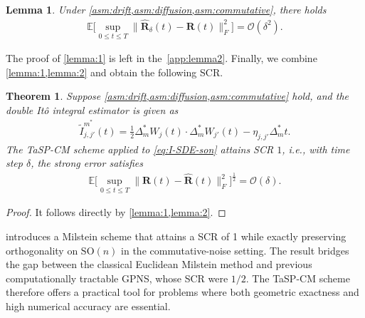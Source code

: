 \documentclass[11pt, a4paper, onecolumn]{article}
\newcommand{\E}{\mathbb{E}}
\newcommand{\bfR}{\mathbf{R}}
\newcommand{\hatR}{\widehat{\bfR}}
\renewcommand{\bf}[1]{\mathbf{#1}}
\newcommand{\nm}[1]{\mathsf{#1}}
\newcommand{\calO}{\mathcal{O}}
\newcommand{\ms}{{m^*}}
\newcommand{\Dms}{{\Delta^{*}_{m}}}
\newcommand{\tIjjpms}{ { \tilde I_{j,j'}^{\ms}} }
\newcommand{\half}{{\frac{1}{2}}}
\DeclareMathOperator{\POnm}{\Pi^O_{N_{\bf R}}}
\newtheorem{theorem}{Theorem}
\newtheorem{remark}{Remark}
\newtheorem{lemma}{Lemma}
\begin{document}
\begin{lemma}\label{lemma:2} Under \cref{asm:drift,asm:diffusion,asm:commutative}, there holds
\begin{align*}
    \E\big[ \sup_{0 \le t\le T} \| \hatR_\delta(t) - \bfR(t) \|^2_F \big]  = \calO(\delta^2).
\end{align*}
\end{lemma}
The proof of \cref{lemma:1} is left in the~\cref{app:lemma2}. Finally, we combine \cref{lemma:1,lemma:2} and obtain the following SCR.
\begin{theorem}\label{thm:convergence-comm} 
    Suppose \cref{asm:drift,asm:diffusion,asm:commutative} hold, and the double It\^o integral estimator is given as 
    \begin{align*}
        \tIjjpms(t) = \half \Dms W_j(t) \cdot \Dms W_{j'}(t) - \eta_{j,j'}\Dms t.
    \end{align*}
    The TaSP-CM scheme applied to \eqref{eq:I-SDE-son} attains SCR $1$, i.e., with time step $\delta$, the strong error satisfies
\begin{align*}
          \E\big[ \sup_{0 \le t\le T} \| \bfR(t) - \hatR(t) \|^2_F \big]^{\half} = \calO(\delta).
     \end{align*}
\end{theorem}
\begin{proof}
It follows directly by \cref{lemma:1,lemma:2}.
\end{proof}

 introduces a Milstein scheme that attains a SCR of 1 while exactly preserving orthogonality on $\mathrm{SO}(n)$ in the commutative-noise setting. The result bridges the gap between the classical Euclidean Milstein method and previous computationally tractable GPNS, whose SCR were $1/2$. The TaSP-CM scheme therefore offers a practical tool for problems where both geometric exactness and high numerical accuracy are essential.



\end{document}
